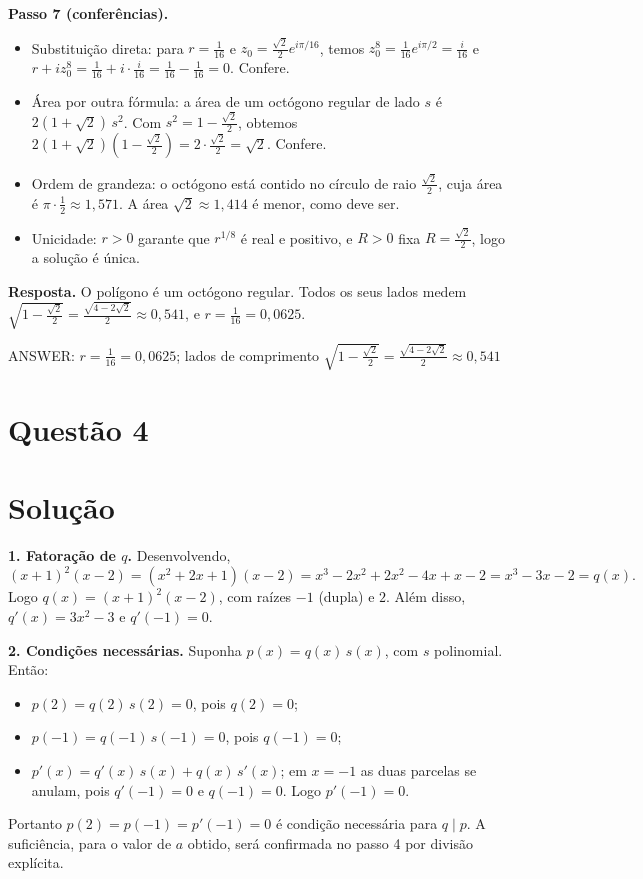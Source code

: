 \documentclass{article}%
\begin{document}
\textbf{Passo 7 (conferências).}
\begin{itemize}
\item Substituição direta: para $r=\frac{1}{16}$ e $z_0=\frac{\sqrt{2}}{2}e^{i\pi/16}$, temos $z_0^8=\frac{1}{16}e^{i\pi/2}=\frac{i}{16}$ e $r+iz_0^8=\frac{1}{16}+i\cdot\frac{i}{16}=\frac{1}{16}-\frac{1}{16}=0$. Confere.
\item Área por outra fórmula: a área de um octógono regular de lado $s$ é $2(1+\sqrt{2})\,s^2$. Com $s^2=1-\frac{\sqrt{2}}{2}$, obtemos $2(1+\sqrt{2})\left(1-\frac{\sqrt{2}}{2}\right)=2\cdot\frac{\sqrt{2}}{2}=\sqrt{2}$. Confere.
\item Ordem de grandeza: o octógono está contido no círculo de raio $\frac{\sqrt{2}}{2}$, cuja área é $\pi\cdot\frac{1}{2}\approx 1{,}571$. A área $\sqrt{2}\approx 1{,}414$ é menor, como deve ser.
\item Unicidade: $r>0$ garante que $r^{1/8}$ é real e positivo, e $R>0$ fixa $R=\frac{\sqrt{2}}{2}$, logo a solução é única.
\end{itemize}

\textbf{Resposta.} O polígono é um octógono regular. Todos os seus lados medem $\sqrt{1-\frac{\sqrt{2}}{2}}=\frac{\sqrt{4-2\sqrt{2}}}{2}\approx 0{,}541$, e $r=\frac{1}{16}=0{,}0625$.

ANSWER: $r=\frac{1}{16}=0{,}0625$; lados de comprimento $\sqrt{1-\frac{\sqrt{2}}{2}}=\frac{\sqrt{4-2\sqrt{2}}}{2}\approx 0{,}541$%
\newpage%
\section*{Questão 4}

\section*{Solução}

\textbf{1. Fatoração de $q$.} Desenvolvendo,
\[
(x+1)^2(x-2)=(x^2+2x+1)(x-2)=x^3-2x^2+2x^2-4x+x-2=x^3-3x-2=q(x).
\]
Logo $q(x)=(x+1)^2(x-2)$, com raízes $-1$ (dupla) e $2$. Além disso, $q'(x)=3x^2-3$ e $q'(-1)=0$.

\textbf{2. Condições necessárias.} Suponha $p(x)=q(x)\,s(x)$, com $s$ polinomial. Então:
\begin{itemize}
\item $p(2)=q(2)\,s(2)=0$, pois $q(2)=0$;
\item $p(-1)=q(-1)\,s(-1)=0$, pois $q(-1)=0$;
\item $p'(x)=q'(x)\,s(x)+q(x)\,s'(x)$; em $x=-1$ as duas parcelas se anulam, pois $q'(-1)=0$ e $q(-1)=0$. Logo $p'(-1)=0$.
\end{itemize}
Portanto $p(2)=p(-1)=p'(-1)=0$ é condição necessária para $q\mid p$. A suficiência, para o valor de $a$ obtido, será confirmada no passo 4 por divisão explícita.
\end{document}
